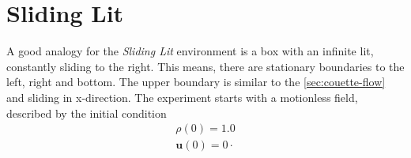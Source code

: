 \section{Sliding Lit}\label{sec:sliding-lit}
A good analogy for the \textit{Sliding Lit} environment is a box with an infinite lit, constantly sliding to the right.
This means, there are stationary boundaries to the left, right and bottom.
The upper boundary is similar to the \cref{sec:couette-flow} and sliding in x-direction.
The experiment starts with a motionless field, described by the initial condition
\begin{equation*}
    \begin{gathered}
        \rho(0) = 1.0 \\
        \mathbf{u}(0) = 0 \cdot
    \end{gathered}
\end{equation*}


